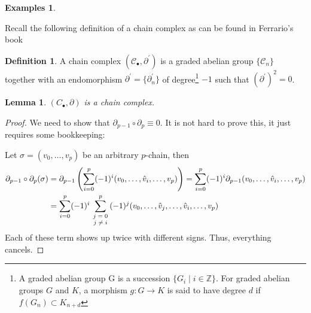 \documentclass[toc=bib]{scrartcl}
\theoremstyle{plain}
\newtheorem{lemma}[theorem]{Lemma}
\theoremstyle{definition}
\newtheorem	{definition}[theorem]{Definition}
\newtheorem{examples}[theorem]{Examples}
\theoremstyle{remark}
\newcommand{\Z}{\mathbb{Z}}
\begin{document}
\begin{examples}
\begin{enumerate}
	\end{enumerate}
	
\end{examples}



Recall the following definition of a chain complex as can be found in Ferrario's book \parencite[p. 65]{fe}
\begin{definition}
	A chain complex $(\mathcal{C}_\bullet,\partial^\prime)$ is a graded abelian group $\{\mathcal{C}_n\}$ together with an endomorphism $\partial^\prime=\{\partial^\prime_n\}$ of degree\footnote{A graded abelian group G is a succession $\{G_i\mid i\in \Z\}$. For graded abelian groups $G$ and $K$, a morphism $g: G\to K$ is said to have degree $d$ if $f(G_n)\subset K_{n+d}$} $-1$ such that $(\partial^\prime)^2=0$.
\end{definition}

\begin{lemma}
	$(C_\bullet,\partial)$ is a chain complex.
\end{lemma}

\begin{proof}
	We need to show that $\partial_{p-1}\circ\partial_p\equiv 0$. It is not hard to prove this, it just requires some bookkeeping:
	
	Let $\sigma=(v_0,\dots,v_p)$ be an arbitrary $p$-chain, then
	\begin{align*}
		\partial_{p-1}\circ\partial_p(\sigma)&=\partial_{p-1}\left(\sum_{i=0}^{p}(-1)^i(v_0,\dots,\hat{v}_i,\dots,v_p)\right)=\sum_{i=0}^{p}(-1)^i\partial_{p-1}(v_0,\dots,\hat{v}_i,\dots,v_p)\\
		&=\sum_{i=0}^{p}(-1)^i\sum_{\parbox{.8cm}{\centering\scriptsize
				$j=0$\\$j\neq i$}}^{p}(-1)^j(v_0,\dots,\hat{v}_j,\dots,\hat{v}_i,\dots,v_p)
	\end{align*}
	Each of these term shows up twice with different signs. Thus, everything cancels.

\end{proof}
\end{document}
